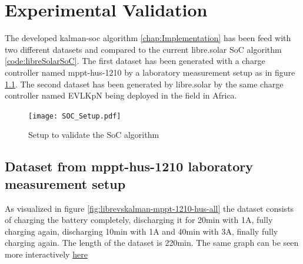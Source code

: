 \chapter{Experimental Validation}

The developed kalman-soc algorithm \ref{chap:Implementation} has been feed with two different datasets and compared to the current libre.solar SoC algorithm \ref{code:libreSolarSoC}. The first dataset  has been generated with a charge controller named mppt-hus-1210 by a laboratory measurement setup as in figure \ref{fig:SoCSetup}. The second dataset has been generated by libre.solar by the same charge controller named EVLKpN being deployed in the field in Africa.


\begin{figure}[h!]
\centering
\texttt{[image: SOC\_Setup.pdf]}
\caption{\label{fig:SoCSetup} Setup to validate the SoC algorithm}
\end{figure}

\pagebreak

\section{Dataset from mppt-hus-1210 laboratory measurement setup}

As visualized in figure \ref{fig:librevskalman-mppt-1210-hus-all} the dataset consists of charging the battery completely, discharging it for 20min with 1A, fully charging again, discharging 10min with 1A and 40min with 3A, finally fully charging again. The length of the dataset is 220min. The same graph can be seen more interactively \href{https://raw.githack.com/mulles/kalman-soc/main/data/mppt-1210-hus_2021-05-28T20:10:00.000Z-2021-05-29T02:19:00.000Z_SOC_Graph.html}{here} 


